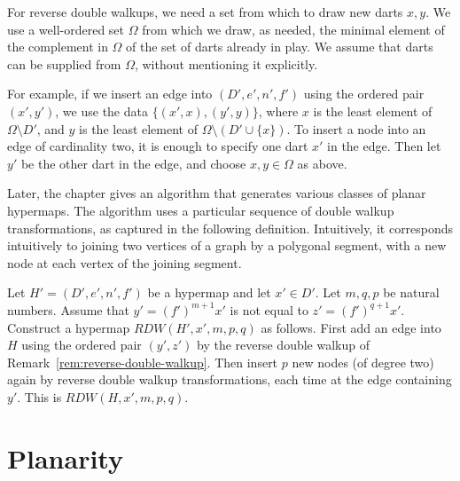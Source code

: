 \begin{remark}\label{rem:dart-universe}
For reverse double walkups, we need a set from which to draw new darts $x,y$.
We  use a well-ordered set $\Omega$ from which we draw, as needed,
the minimal element of the complement in $\Omega$ of the set of darts
already in play.  We assume that darts can be supplied from $\Omega$,
without mentioning it explicitly.  

For example, if we insert an edge into $(D',e',n',f')$ using the
ordered pair $(x',y')$, we use the data $\{(x',x),(y',y)\}$, where $x$
is the least element of $\Omega\setminus D'$, and $y$ is the least
element of $\Omega\setminus (D'\cup \{x\})$.  To insert a node into an
edge of cardinality two, it is enough to specify one dart $x'$ in the
edge.  Then let $y'$ be the other dart in the edge, and choose $x,y\in
\Omega$ as above.  
\end{remark}

Later, the chapter gives an algorithm that generates various
classes of planar hypermaps.  The algorithm uses a particular sequence
of double walkup transformations, as captured in the following
definition.  Intuitively, it corresponds  intuitively to joining two vertices of a
graph by a polygonal segment, with a new node at each vertex of the
joining segment.

\begin{definition}\label{def:R}
  Let $H'=(D',e',n',f')$ be a hypermap and let $x'\in D'$.  
Let $m,q,p$ be natural numbers.  Assume that $y' =(f')^{m+1}x'$ is not
equal to $z'=(f')^{q+1}x'$.
Construct a hypermap $RDW(H',x',m,p,q)$  as follows.  
First
  add an edge into $H$ using the ordered pair $(y',z')$
by the reverse double walkup of
  Remark~\ref{rem:reverse-double-walkup}.  Then insert $p$ new nodes
  (of degree two) again by reverse double
  walkup transformations, each time at the edge containing $y'$.  
This is $RDW(H,x',m,p,q)$.
\end{definition}


\section{Planarity}
%
%

